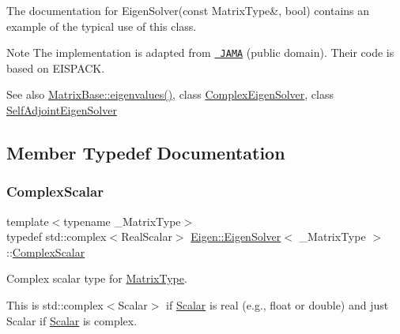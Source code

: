 The documentation for Eigen\+Solver(const Matrix\+Type\&, bool) contains an example of the typical use of this class.

\begin{DoxyNote}{Note}
The implementation is adapted from \href{http://math.nist.gov/javanumerics/jama/}{\texttt{ J\+A\+MA}} (public domain). Their code is based on E\+I\+S\+P\+A\+CK.
\end{DoxyNote}
\begin{DoxySeeAlso}{See also}
\mbox{\hyperlink{class_eigen_1_1_matrix_base_a30430fa3d5b4e74d312fd4f502ac984d}{Matrix\+Base\+::eigenvalues()}}, class \mbox{\hyperlink{class_eigen_1_1_complex_eigen_solver}{Complex\+Eigen\+Solver}}, class \mbox{\hyperlink{class_eigen_1_1_self_adjoint_eigen_solver}{Self\+Adjoint\+Eigen\+Solver}} 
\end{DoxySeeAlso}


\subsection{Member Typedef Documentation}
\mbox{\label{class_eigen_1_1_eigen_solver_a4d0b2a773357d0a6ec98e026f04002ed}} 
\subsubsection{\texorpdfstring{ComplexScalar}{ComplexScalar}}
{\footnotesize\ttfamily template$<$typename \+\_\+\+Matrix\+Type$>$ \\
typedef std\+::complex$<$Real\+Scalar$>$ \mbox{\hyperlink{class_eigen_1_1_eigen_solver}{Eigen\+::\+Eigen\+Solver}}$<$ \+\_\+\+Matrix\+Type $>$\+::\mbox{\hyperlink{class_eigen_1_1_eigen_solver_a4d0b2a773357d0a6ec98e026f04002ed}{Complex\+Scalar}}}



Complex scalar type for \mbox{\hyperlink{class_eigen_1_1_eigen_solver_a83acd180404ddaac8a678fa65a6b632b}{Matrix\+Type}}. 

This is {\ttfamily std\+::complex$<$\+Scalar$>$} if \mbox{\hyperlink{class_eigen_1_1_eigen_solver_a017d49fe0d59874b70a2fcf35e5aa373}{Scalar}} is real (e.\+g., {\ttfamily float} or {\ttfamily double}) and just {\ttfamily Scalar} if \mbox{\hyperlink{class_eigen_1_1_eigen_solver_a017d49fe0d59874b70a2fcf35e5aa373}{Scalar}} is complex. \mbox{\label{class_eigen_1_1_eigen_solver_adc446bcb60572758fa64515f2825db62}} 
